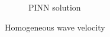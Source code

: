 \begin{frame}
\begin{figure}
\begin{subfigure}[b]{0.45\textwidth}
            \caption{PINN solution}
            \label{fig:10_homogeneous_pinn_swe_velocity}
        \end{subfigure}
        \caption{Homogeneous wave velocity}
        \label{fig:11_homogeneous_results}
    \end{figure}
\end{frame}